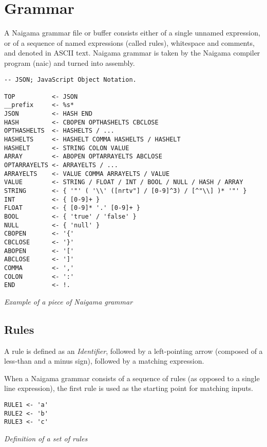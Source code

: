 \section{Grammar}

A Naigama grammar file or buffer consists either of a single
unnamed expression, or of a sequence of named expressions (called rules),
whitespace and comments, and denoted in ASCII text.
Naigama grammar is taken by the Naigama compiler program (naic) and turned
into assembly.

\begin{myquote}
\begin{verbatim}
-- JSON; JavaScript Object Notation.

TOP          <- JSON
__prefix     <- %s*
JSON         <- HASH END
HASH         <- CBOPEN OPTHASHELTS CBCLOSE
OPTHASHELTS  <- HASHELTS / ...
HASHELTS     <- HASHELT COMMA HASHELTS / HASHELT
HASHELT      <- STRING COLON VALUE
ARRAY        <- ABOPEN OPTARRAYELTS ABCLOSE
OPTARRAYELTS <- ARRAYELTS / ...
ARRAYELTS    <- VALUE COMMA ARRAYELTS / VALUE
VALUE        <- STRING / FLOAT / INT / BOOL / NULL / HASH / ARRAY
STRING       <- { '"' ( '\\' ([nrtv"] / [0-9]^3) / [^"\\] )* '"' }
INT          <- { [0-9]+ }
FLOAT        <- { [0-9]* '.' [0-9]+ }
BOOL         <- { 'true' / 'false' }
NULL         <- { 'null' }
CBOPEN       <- '{'
CBCLOSE      <- '}'
ABOPEN       <- '['
ABCLOSE      <- ']'
COMMA        <- ','
COLON        <- ':'
END          <- !.

\end{verbatim}
\end{myquote}
\textit{Example of a piece of Naigama grammar}

\subsection{Rules}

A rule is defined as an \textit{Identifier}, followed by a
left-pointing arrow (composed of a less-than and a minus sign),
followed by a matching expression.

When a Naigama grammar consists of a sequence of rules
(as opposed to a single line expression),
the first rule is used as the starting point for matching inputs.

\begin{myquote}
\begin{verbatim}
RULE1 <- 'a'
RULE2 <- 'b'
RULE3 <- 'c'

\end{verbatim}
\end{myquote}
\textit{Definition of a set of rules}

